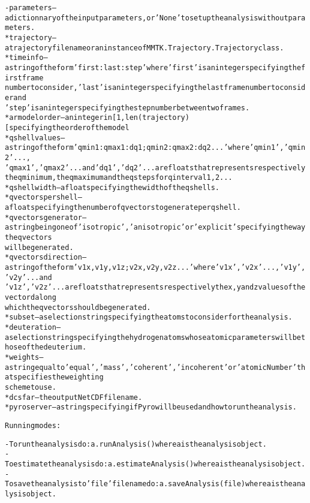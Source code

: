 \begin{alltt}
    - {\textbar}parameters{\textbar} -- a dictionnary of the input parameters, or 'None' to set up the analysis without parameters.
        * trajectory        -- a trajectory file name or an instance of MMTK.Trajectory.Trajectory class.
        * timeinfo          -- a string of the form 'first:last:step' where 'first' is an integer specifying the first frame 
                               number to consider, 'last' is an integer specifying the last frame number to consider and 
                               'step' is an integer specifying the step number between two frames.
        * armodelorder      -- an integer in [1, len(trajectory)[ specifying the order of the model
        * qshellvalues      -- a string of the form 'qmin1:qmax1:dq1;qmin2:qmax2:dq2...' where 'qmin1', 'qmin2' ... , 
                               'qmax1', 'qmax2' ... and 'dq1', 'dq2' ... are floats that represents respectively 
                               the q minimum, the q maximum and the q steps for q interval 1, 2 ...
        * qshellwidth       -- a float specifying the width of the q shells.
        * qvectorspershell  -- a float specifying the number of q vectors to generate per q shell.
        * qvectorsgenerator -- a string being one of 'isotropic', 'anisotropic' or 'explicit' specifying the way the q vectors
                               will be generated.
        * qvectorsdirection -- a string of the form 'v1x,v1y,v1z;v2x,v2y,v2z...' where 'v1x', 'v2x' ..., 'v1y', 'v2y' ... and
                               'v1z', 'v2z' ... are floats that represents respectively the x, y and z values of the vectord along 
                               which the q vectors should be generated.
        * subset            -- a selection string specifying the atoms to consider for the analysis.
        * deuteration       -- a selection string specifying the hydrogen atoms whose atomic parameters will be those of the deuterium.
        * weights           -- a string equal to 'equal', 'mass', 'coherent' , 'incoherent' or 'atomicNumber' that specifies the weighting
                               scheme to use.
        * dcsfar            -- the output NetCDF file name.
        * pyroserver        -- a string specifying if Pyro will be used and how to run the analysis.
    
Running modes:

    - To run the analysis do: a.runAnalysis() where a is the analysis object.
    - To estimate the analysis do: a.estimateAnalysis() where a is the analysis object.
    - To save the analysis to 'file' file name do: a.saveAnalysis(file) where a is the analysis object.
    
\end{alltt}


